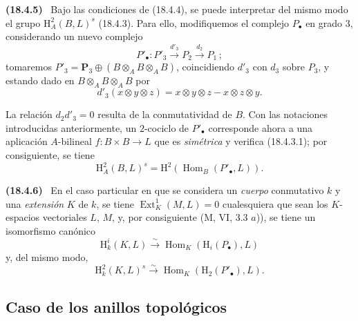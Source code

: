 \documentclass[10pt,oneside]{book}
\makeatletter
\newcommand{\setmanualcurrentlabel}[1]{\def\@currentlabel{#1}}
\newenvironment{env}[1][]{\setmanualcurrentlabel{#1}\par\medskip\noindent\textbf{(#1)}\ }{\par}
\makeatother
\begin{document}
\begin{env}[18.4.5]
\label{0.18.4.5-es}
Bajo las condiciones de (18.4.4), se puede interpretar del mismo modo el
grupo $\mathrm H_A^2(B,L)^s$ (18.4.3). Para ello, modifiquemos el complejo
$P_\bullet$ en grado $3$, considerando un nuevo complejo
\[
  P'_\bullet:P'_3\xrightarrow{d'_3}P_2
  \xrightarrow{d_2}P_1\,;
\]
tomaremos
$P'_3=\mathbf P_3\oplus(B\otimes_A B\otimes_A B)$, coincidiendo
$d'_3$ con $d_3$ sobre $P_3$, y estando dado en
$B\otimes_A B\otimes_A B$ por
\[
  d'_3(x\otimes y\otimes z)=x\otimes y\otimes z-x\otimes z\otimes y.
\]

La relación $d_2d'_3=0$ resulta de la conmutatividad de $B$. Con las notaciones
introducidas anteriormente, un $2$-cociclo de $P'_\bullet$ corresponde
ahora a una aplicación $A$-bilineal $f:B\times B\to L$ que es
\emph{simétrica} y verifica (18.4.3.1); por consiguiente, se tiene
\[
  \mathrm H_A^2(B,L)^s
  =\mathrm H^2(\operatorname{Hom}_B(P'_\bullet,L)).
\]
\end{env}

\begin{env}[18.4.6]
\label{0.18.4.6-es}
En el caso particular en que se considera un \emph{cuerpo} conmutativo $k$ y
una \emph{extensión} $K$ de $k$, se tiene
$\operatorname{Ext}_K^1(M,L)=0$ cualesquiera que sean los $K$-espacios
vectoriales $L$, $M$, y, por consiguiente (M, VI, 3.3 $a$)), se tiene un
isomorfismo canónico
\begin{equation}
\label{0.18.4.6.1-es}
\tag{18.4.6.1}
  \mathrm H_k^i(K,L)\xrightarrow{\sim}
  \operatorname{Hom}_K(\mathrm H_i(P_\bullet),L)
\end{equation}
y, del mismo modo,
\begin{equation}
\label{0.18.4.6.2-es}
\tag{18.4.6.2}
  \mathrm H_k^2(K,L)^s\xrightarrow{\sim}
  \operatorname{Hom}_K(\mathrm H_2(P'_\bullet),L).
\end{equation}
\end{env}

\subsection{Caso de los anillos topológicos}
\label{subsection:0.18.5-es}
\end{document}
